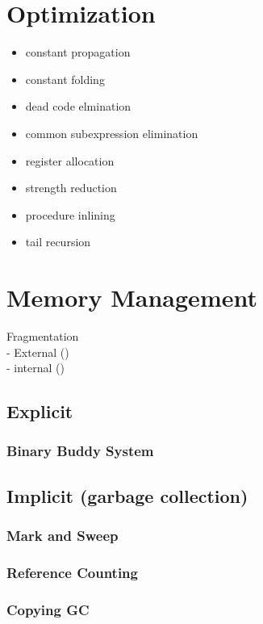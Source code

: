 \documentclass[12pt]{article}
\begin{document}
	\section*{Optimization}
	\begin{itemize}
		\item constant propagation
		\item constant folding
		\item dead code elmination
		\item common subexpression elimination
		\item register allocation
		\item strength reduction
		\item procedure inlining
		\item tail recursion
	\end{itemize}
	
	\section*{Memory Management}
	Fragmentation\\
	- External ()\\
	- internal ()\\
	\subsection*{Explicit}
	\subsubsection*{Binary Buddy System}
	
	\subsection*{Implicit (garbage collection)}
	\subsubsection*{Mark and Sweep}
	\subsubsection*{Reference Counting}
	\subsubsection*{Copying GC}
	
\end{document}
